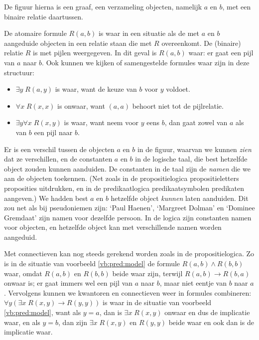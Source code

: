 \begin{example}\label{vb:pred:model}
De figuur hierna is een graaf, een verzameling objecten, namelijk $a$ en $b$, met een binaire relatie daartussen.
\begin{center}
\end{center}
De atomaire formule $R(a,b)$ is waar in een situatie als de met $a$ en $b$ aangeduide objecten in een relatie staan die met $R$ overeenkomt. De (binaire) relatie $R$ is met pijlen weergegeven. In dit geval is $R(a,b)$ waar: er gaat een pijl van $a$ naar $b$. Ook kunnen we kijken of samengestelde formules waar zijn in deze structuur:
\begin{itemize}
    \item $\exists y\;R(a,y)$ is waar, want de keuze van $b$ voor $y$ voldoet.
    \item $\forall x\;R(x,x)$ is onwaar, want $(a,a)$ behoort niet tot de pijlrelatie.
    \item $\exists y\forall x\;R(x,y)$ is waar, want neem voor $y$ eens $b$, dan gaat zowel van $a$ als van $b$ een pijl naar $b$.
\end{itemize}
\end{example}
Er is een verschil tussen de objecten $a$ en $b$ in de figuur, waarvan we kunnen \textit{zien} dat ze verschillen, en de constanten $a$ en $b$ in de logische taal, die best hetzelfde object zouden kunnen aanduiden. De constanten in de taal zijn de \textit{namen} die we aan de objecten toekennen. (Net zoals in de propositielogica propositieletters proposities uitdrukken, en in de predikaatlogica predikaatsymbolen predikaten aangeven.) We hadden best $a$ en $b$ hetzelfde object \textit{kunnen} laten aanduiden. Dit zou net als bij pseudoniemen zijn: `Paul Haenen', `Margreet Dolman' en `Dominee Gremdaat' zijn namen voor dezelfde persoon. In de logica zijn constanten namen voor objecten, en hetzelfde object kan met verschillende namen worden aangeduid.

Met connectieven kan nog steeds gerekend worden zoals in de propositielogica. Zo is in de situatie van voorbeeld \ref{vb:pred:model} de formule $R(a,b)\wedge R(b,b)$ waar, omdat $R(a,b)$ en $R(b,b)$ beide waar zijn, terwijl $R(a,b)\rightarrow R(b,a)$ onwaar is; er gaat immers wel een pijl van $a$ naar $b$, maar niet eentje van $b$ naar $a$. Vervolgens kunnen we kwantoren en connectieven weer in formules combineren: $\forall y(\exists x\;R(x,y)\rightarrow R(y,y))$ is waar in de situatie van voorbeeld \ref{vb:pred:model}, want als $y=a$, dan is $\exists x\;R(x,y)$ onwaar en dus de implicatie waar, en als $y=b$, dan zijn $\exists x\;R(x,y)$ en $R(y,y)$ beide waar en ook dan is de implicatie waar.

